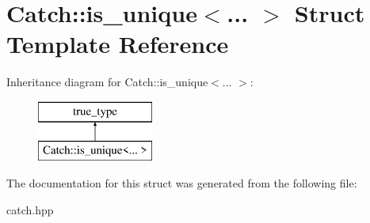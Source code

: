 \hypertarget{structCatch_1_1is__unique}{}\section{Catch\+::is\+\_\+unique$<$... $>$ Struct Template Reference}
\label{structCatch_1_1is__unique}
Inheritance diagram for Catch\+::is\+\_\+unique$<$... $>$\+:\begin{figure}[H]
\begin{center}
\leavevmode
\includegraphics[height=2.000000cm]{structCatch_1_1is__unique}
\end{center}
\end{figure}


The documentation for this struct was generated from the following file\+:\begin{DoxyCompactItemize}
\item 
catch.\+hpp\end{DoxyCompactItemize}
